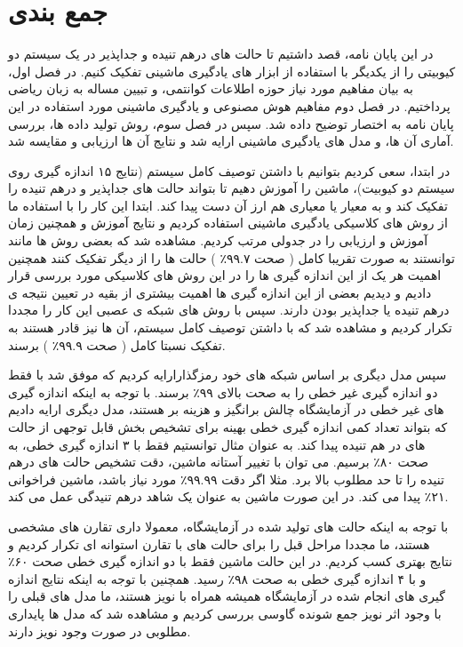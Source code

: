 \section{جمع بندی}
در این پایان نامه، قصد داشتیم تا حالت های درهم تنیده و جداپذیر در یک سیستم دو کیوبیتی را از یکدیگر با استفاده از ابزار های یادگیری ماشینی تفکیک کنیم. در فصل اول، به بیان مفاهیم مورد نیاز حوزه اطلاعات کوانتمی، و تبیین مساله به زبان ریاضی پرداختیم. در فصل دوم مفاهیم هوش مصنوعی و یادگیری ماشینی مورد استفاده در این پایان نامه به اختصار توضیح داده شد. سپس در فصل سوم، روش تولید داده ها، بررسی آماری آن ها، و مدل های یادگیری ماشینی ارایه شد و نتایج آن ها ارزیابی و مقایسه شد.


در ابتدا، سعی کردیم بتوانیم با داشتن توصیف کامل سیستم (نتایج ۱۵ اندازه گیری روی سیستم دو کیوبیت)، ماشین را آموزش دهیم تا بتواند حالت های جداپذیر و درهم تنیده را تفکیک کند و به معیار
یا معیاری هم ارز آن دست پیدا کند.
ابتدا این کار را با استفاده ما از روش های کلاسیکی یادگیری ماشینی استفاده کردیم و نتایج آموزش و همچنین زمان آموزش و ارزیابی را در جدولی مرتب کردیم. مشاهده شد که بعضی روش ها مانند
توانستند به صورت تقریبا کامل
(
صحت
۹۹.۷٪
)
حالت ها را از دیگر تفکیک کنند
همچنین اهمیت هر یک از این اندازه گیری ها را در این روش های کلاسیکی مورد بررسی قرار دادیم و دیدیم بعضی از این اندازه گیری ها اهمیت بیشتری از بقیه در تعیین نتیجه ی درهم تنیده یا جداپذیر بودن دارند.
سپس با روش های شبکه ی عصبی این کار را مجددا تکرار کردیم و مشاهده شد که با داشتن توصیف کامل سیستم، آن ها نیز قادر هستند به تفکیک نسبتا کامل
(
صحت
۹۹.۹٪
)
برسند.


سپس مدل دیگری بر اساس شبکه های خود رمزگذارارایه کردیم که موفق شد با فقط دو اندازه گیری غیر خطی را به صحت
بالای
۹۹٪
برسند. با توجه به اینکه اندازه گیری های غیر خطی در آزمایشگاه چالش برانگیز و هزینه بر هستند، مدل دیگری ارایه دادیم که بتواند تعداد کمی اندازه گیری خطی بهینه برای تشخیص بخش قابل توجهی از حالت های در هم تنیده پیدا کند. به عنوان مثال توانستیم فقط با ۳ اندازه گیری خطی، به صحت
۸۰٪
برسیم. می توان با تغییر آستانه ماشین، دقت تشخیص حالت های درهم تنیده را تا حد مطلوب بالا برد. مثلا اگر دقت
۹۹.۹۹٪
مورد نیاز باشد، ماشین فراخوانی
۲۱٪
پیدا می کند. در این صورت ماشین به عنوان یک شاهد درهم تنیدگی عمل می کند.

با توجه به اینکه حالت های تولید شده در آزمایشگاه، معمولا داری تقارن های مشخصی هستند، ما مجددا مراحل قبل را برای حالت های با تقارن استوانه ای تکرار کردیم و نتایج بهتری کسب کردیم. در این حالت ماشین فقط با دو اندازه گیری خطی صحت
۶۰٪
و با ۴ اندازه گیری خطی
به صحت
۹۸٪
رسید. همچنین با توجه به اینکه نتایج اندازه گیری های انجام شده در آزمایشگاه همیشه همراه با نویز هستند، ما مدل های قبلی را با وجود اثر نویز جمع شونده گاوسی بررسی کردیم و مشاهده شد که مدل ها پایداری مطلوبی در صورت وجود نویز دارند.

